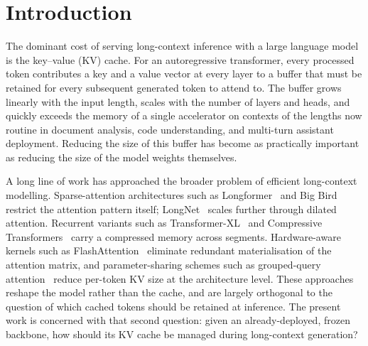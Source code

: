 \documentclass[sn-nature,Numbered]{sn-jnl}
\begin{document}
\section{Introduction}\label{sec:intro}

The dominant cost of serving long-context inference with a large language model is the key--value (KV) cache. For an autoregressive transformer, every processed token contributes a key and a value vector at every layer to a buffer that must be retained for every subsequent generated token to attend to. The buffer grows linearly with the input length, scales with the number of layers and heads, and quickly exceeds the memory of a single accelerator on contexts of the lengths now routine in document analysis, code understanding, and multi-turn assistant deployment. Reducing the size of this buffer has become as practically important as reducing the size of the model weights themselves.

A long line of work has approached the broader problem of efficient long-context modelling. Sparse-attention architectures such as Longformer~\cite{beltagy2020longformer} and Big Bird~\cite{zaheer2020bigbird} restrict the attention pattern itself; LongNet~\cite{ding2023longnet} scales further through dilated attention. Recurrent variants such as Transformer-XL~\cite{dai2019transformerxl} and Compressive Transformers~\cite{rae2020compressive} carry a compressed memory across segments. Hardware-aware kernels such as FlashAttention~\cite{dao2022flashattention} eliminate redundant materialisation of the attention matrix, and parameter-sharing schemes such as grouped-query attention~\cite{ainslie2023gqa} reduce per-token KV size at the architecture level. These approaches reshape the model rather than the cache, and are largely orthogonal to the question of which cached tokens should be retained at inference. The present work is concerned with that second question: given an already-deployed, frozen backbone, how should its KV cache be managed during long-context generation?
\end{document}
